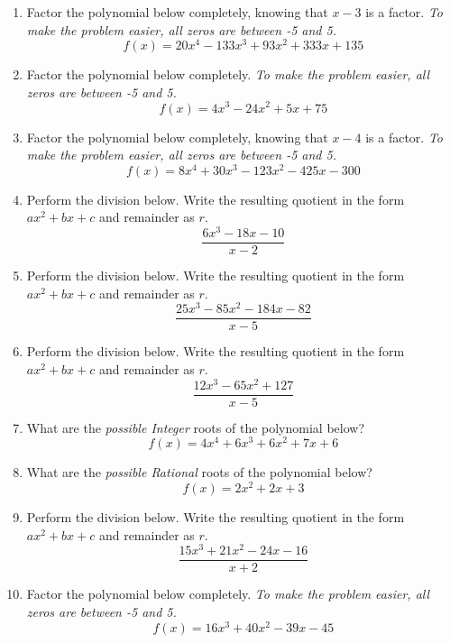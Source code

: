 \documentclass[14pt]{extbook}
\begin{document}
\begin{enumerate}
\item{
Factor the polynomial below completely, knowing that $x -3$ is a factor. \textit{To make the problem easier, all zeros are between -5 and 5.}\[ f(x) = 20x^{4} -133 x^{3} +93 x^{2} +333 x + 135 \]} \newpage
\item{
Factor the polynomial below completely. \textit{To make the problem easier, all zeros are between -5 and 5.}\[ f(x) = 4x^{3} -24 x^{2} +5 x + 75 \]} \newpage
\item{
Factor the polynomial below completely, knowing that $x -4$ is a factor. \textit{To make the problem easier, all zeros are between -5 and 5.}\[ f(x) = 8x^{4} +30 x^{3} -123 x^{2} -425 x -300 \]} \newpage
\item{
Perform the division below. Write the resulting quotient in the form $ax^2+bx+c$ and remainder as $r$.\[ \frac{6x^{3} -18 x -10}{x -2} \]} \newpage
\item{
Perform the division below. Write the resulting quotient in the form $ax^2+bx+c$ and remainder as $r$.\[ \frac{25x^{3} -85 x^{2} -184 x -82}{x -5} \]} \newpage
\item{
Perform the division below. Write the resulting quotient in the form $ax^2+bx+c$ and remainder as $r$.\[ \frac{12x^{3} -65 x^{2} + 127}{x -5} \]} \newpage
\item{
What are the \textit{possible Integer} roots of the polynomial below?\[ f(x) = 4x^{4} +6 x^{3} +6 x^{2} +7 x + 6 \]} \newpage
\item{
What are the \textit{possible Rational} roots of the polynomial below?\[ f(x) = 2x^{2} +2 x + 3 \]} \newpage
\item{
Perform the division below. Write the resulting quotient in the form $ax^2+bx+c$ and remainder as $r$.\[ \frac{15x^{3} +21 x^{2} -24 x -16}{x + 2} \]} \newpage
\item{
Factor the polynomial below completely. \textit{To make the problem easier, all zeros are between -5 and 5.}\[ f(x) = 16x^{3} +40 x^{2} -39 x -45 \]} \newpage
\end{enumerate}
\end{document}
